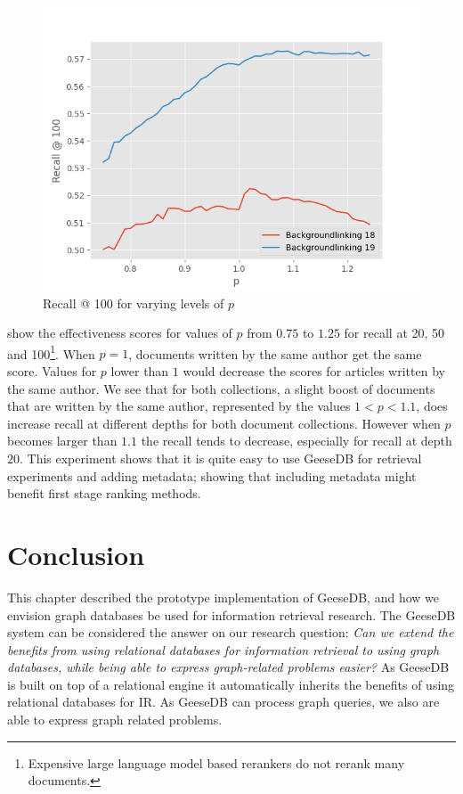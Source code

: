 \begin{figure}
	\centering
	\includegraphics[width=0.9\linewidth]{./imgs/recall-100-geesedb.png}
	\caption{Recall @ 100 for varying levels of $p$}
	\label{geesedb-recall-100}
\end{figure}

 show the effectiveness scores for values of $p$ from $0.75$ to $1.25$ for recall at 20, 50 and 100\footnote{Expensive large language model based rerankers do not rerank many documents.}. When $p = 1$, documents written by the same author get the same score. Values for $p$ lower than $1$ would decrease the scores for articles written by the same author.  
We see that for both collections, a slight boost of documents that are written by the same author, represented by the values $1 < p < 1.1$, does increase recall at different depths for both document collections.  However when $p$ becomes larger than $1.1$ the recall tends to decrease, especially for recall at depth $20$. 
This experiment shows that it is quite easy to use GeeseDB for retrieval experiments and adding metadata; showing that including metadata might benefit first stage ranking methods.

\section{Conclusion}
This chapter described the prototype implementation of GeeseDB, and how we envision graph databases be used for information retrieval research.
The GeeseDB system can be considered the answer on our research question: \emph{Can we extend the benefits from using relational databases for information retrieval to using graph databases, while being able to express graph-related problems easier?}
As GeeseDB is built on top of a relational engine it automatically inherits the benefits of using relational databases for IR. As GeeseDB can process graph queries, we also are able to express graph related problems. 


